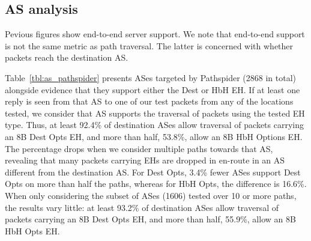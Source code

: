 \documentclass[conference]{IEEEtran}
\begin{document}
\subsection{AS analysis }

Pevious figures show end-to-end server support. We note that end-to-end support is not the same metric as path traversal. The latter is concerned with whether packets reach the destination AS.

Table~\ref{tbl:as_pathspider} presents ASes targeted by Pathspider (2868 in total) alongside evidence that they support either the Dest or HbH EH.
If at least one reply is seen from that AS to one of our test packets from any of the locations tested, we consider that AS supports the traversal of packets using the tested EH type. Thus, at least 92.4\% of destination ASes allow traversal of packets carrying an 8B Dest Opts EH, and more than half, 53.8\%, allow an 8B HbH Options EH. The percentage drops when we consider multiple paths towards that AS, revealing that many packets carrying EHs are dropped in en-route in an AS different from the destination AS. For Dest Opts, 3.4\% fewer ASes support Dest Opts on more than half the paths, whereas for HbH Opts, the difference is 16.6\%.
When only considering the subset of ASes (1606) tested over 10 or more paths, the results vary little: at least 93.2\% of destination ASes allow traversal of packets carrying an 8B Dest Opts EH, and more than half, 55.9\%, allow an 8B HbH Opts EH.
\end{document}
